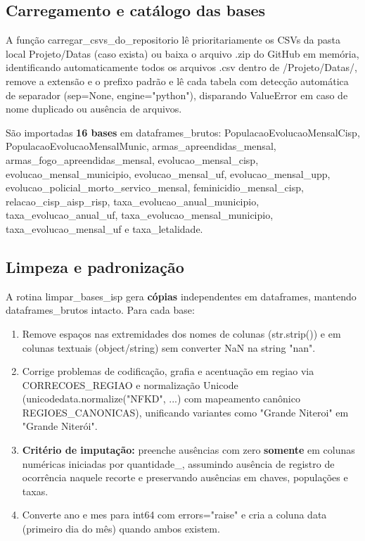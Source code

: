 \documentclass[11pt,a4paper]{article}
\newcommand{\code}[1]{{\ttfamily\footnotesize\allowbreak #1}}
\begin{document}
\subsection{Carregamento e catálogo das bases}
A função \code{carregar\_csvs\_do\_repositorio} lê prioritariamente os CSVs da pasta local \code{Projeto/Datas} (caso exista) ou baixa o arquivo \code{.zip} do GitHub em memória, identificando automaticamente todos os arquivos \code{.csv} dentro de \code{/Projeto/Datas/}, remove a extensão e o prefixo padrão e lê cada tabela com detecção automática de separador (\code{sep=None, engine="python"}), disparando \code{ValueError} em caso de nome duplicado ou ausência de arquivos.

São importadas \textbf{16 bases} em \code{dataframes\_brutos}: \code{PopulacaoEvolucaoMensalCisp}, \code{PopulacaoEvolucaoMensalMunic}, \code{armas\_apreendidas\_mensal}, \code{armas\_fogo\_apreendidas\_mensal}, \code{evolucao\_mensal\_cisp}, \code{evolucao\_mensal\_municipio}, \code{evolucao\_mensal\_uf}, \code{evolucao\_mensal\_upp}, \code{evolucao\_policial\_morto\_servico\_mensal}, \code{feminicidio\_mensal\_cisp}, \code{relacao\_cisp\_aisp\_risp}, \code{taxa\_evolucao\_anual\_municipio}, \code{taxa\_evolucao\_anual\_uf}, \code{taxa\_evolucao\_mensal\_municipio}, \code{taxa\_evolucao\_mensal\_uf} e \code{taxa\_letalidade}.

\subsection{Limpeza e padronização}
A rotina \code{limpar\_bases\_isp} gera \textbf{cópias} independentes em \code{dataframes}, mantendo \code{dataframes\_brutos} intacto. Para cada base:
\begin{enumerate}
  \setlength{\itemsep}{2pt}\setlength{\parskip}{0pt}
  \item Remove espaços nas extremidades dos nomes de colunas (\code{str.strip()}) e em colunas textuais (\code{object}/\code{string}) sem converter \code{NaN} na string \code{"nan"}.
  \item Corrige problemas de codificação, grafia e acentuação em \code{regiao} via \code{CORRECOES\_REGIAO} e normalização Unicode (\code{unicodedata.normalize("NFKD", ...)} com mapeamento canônico \code{REGIOES\_CANONICAS}), unificando variantes como \code{"Grande Niteroi"} em \code{"Grande Niterói"}.
  \item \textbf{Critério de imputação:} preenche ausências com zero \textbf{somente} em colunas numéricas iniciadas por \code{quantidade\_}, assumindo ausência de registro de ocorrência naquele recorte e preservando ausências em chaves, populações e taxas.
  \item Converte \code{ano} e \code{mes} para \code{int64} com \code{errors="raise"} e cria a coluna \code{data} (primeiro dia do mês) quando ambos existem.
\end{enumerate}
\end{document}
